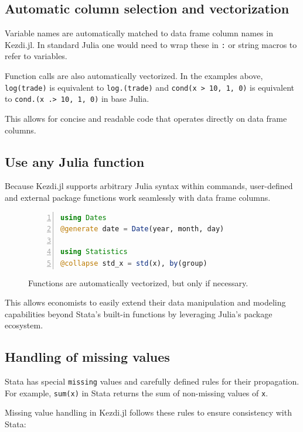 \documentclass{juliacon}
\begin{document}
\subsection{Automatic column selection and vectorization}

Variable names are automatically matched to data frame column names in Kezdi.jl. In standard Julia one would need to wrap these in \texttt{:} or string macros to refer to variables.

Function calls are also automatically vectorized. In the examples above, \texttt{log(trade)} is equivalent to \texttt{log.(trade)} and \texttt{cond(x > 10, 1, 0)} is equivalent to \texttt{cond.(x .> 10, 1, 0)} in base Julia.

This allows for concise and readable code that operates directly on data frame columns.

\subsection{Use any Julia function}

Because Kezdi.jl supports arbitrary Julia syntax within commands, user-defined and external package functions work seamlessly with data frame columns.

\begin{figure}[t]
\begin{lstlisting}[language = Julia, numbers=left, numberstyle=\tiny\color{gray}]
using Dates
@generate date = Date(year, month, day)

using Statistics
@collapse std_x = std(x), by(group) 
\end{lstlisting}
	
\caption{Functions are automatically vectorized, but only if necessary.}
\label{fig:vectorization}
\end{figure}

This allows economists to easily extend their data manipulation and modeling capabilities beyond Stata's built-in functions by leveraging Julia's package ecosystem.

\subsection{Handling of missing values}

Stata has special \texttt{missing} values and carefully defined rules for their propagation. For example, \texttt{sum(x)} in Stata returns the sum of non-missing values of \texttt{x}.

Missing value handling in Kezdi.jl follows these rules to ensure consistency with Stata:
\end{document}
